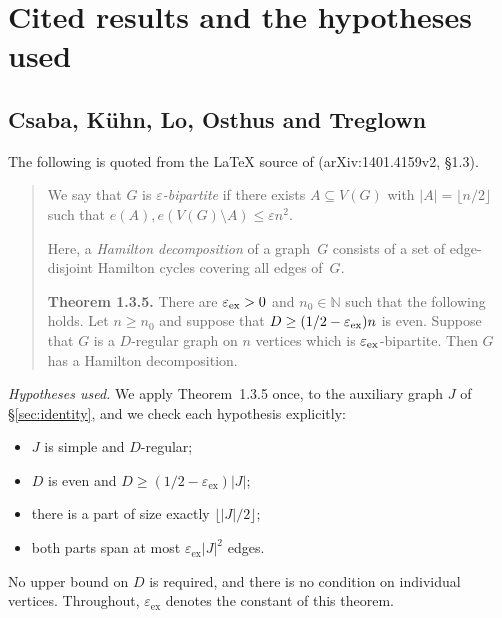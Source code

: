 \documentclass[11pt]{article}
\theoremstyle{definition}
\newcommand{\eps}{\varepsilon}
\newcommand{\epsex}{\eps_{\mathrm{ex}}}
\begin{document}
\section{Cited results and the hypotheses used}\label{sec:cited}

\subsection{Csaba, K\"uhn, Lo, Osthus and Treglown}
The following is quoted from the LaTeX source of \cite{CKLOT} (arXiv:1401.4159v2, \S1.3).

\begin{quote}
We say that $G$ is \emph{$\eps$-bipartite} if there exists $A\subseteq V(G)$ with $|A|=\lfloor n/2\rfloor$ such that $e(A), e(V(G)\setminus A) \le \eps n^{2}$.

Here, a \emph{Hamilton decomposition} of a graph~$G$ consists of a set of edge-disjoint Hamilton cycles covering all edges of~$G$.

\textbf{Theorem 1.3.5.} There are $\eps_{\rm ex} >0$ and $n_0\in\mathbb{N}$ such that the following holds. Let $n\ge n_0$ and suppose that $D \ge (1/2-\eps_{\rm ex})n$ is even. Suppose that $G$ is a $D$-regular graph on $n$ vertices which is $\eps_{\rm ex}$-bipartite. Then $G$ has a Hamilton decomposition.
\end{quote}

\noindent\emph{Hypotheses used.} We apply Theorem~1.3.5 once, to the auxiliary graph $J$ of \S\ref{sec:identity}, and we check each hypothesis explicitly:
\begin{itemize}[nosep]
\item $J$ is simple and $D$-regular;
\item $D$ is even and $D\ge(1/2-\epsex)|J|$;
\item there is a part of size exactly $\lfloor|J|/2\rfloor$;
\item both parts span at most $\epsex|J|^2$ edges.
\end{itemize}
No upper bound on $D$ is required, and there is no condition on individual vertices. Throughout, $\epsex$ denotes the constant of this theorem.
\end{document}
